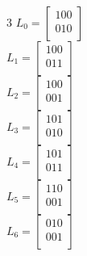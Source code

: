 \begin{multicols}{3}
$L_{0}=\left[
\begin{array}{c}
100\\
010\\
\end{array}
\right]
$\\
$L_{1}=\left[
\begin{array}{c}
100\\
011\\
\end{array}
\right]
$\\
$L_{2}=\left[
\begin{array}{c}
100\\
001\\
\end{array}
\right]
$\\
$L_{3}=\left[
\begin{array}{c}
101\\
010\\
\end{array}
\right]
$\\
$L_{4}=\left[
\begin{array}{c}
101\\
011\\
\end{array}
\right]
$\\
$L_{5}=\left[
\begin{array}{c}
110\\
001\\
\end{array}
\right]
$\\
$L_{6}=\left[
\begin{array}{c}
010\\
001\\
\end{array}
\right]
$\\
\end{multicols}
